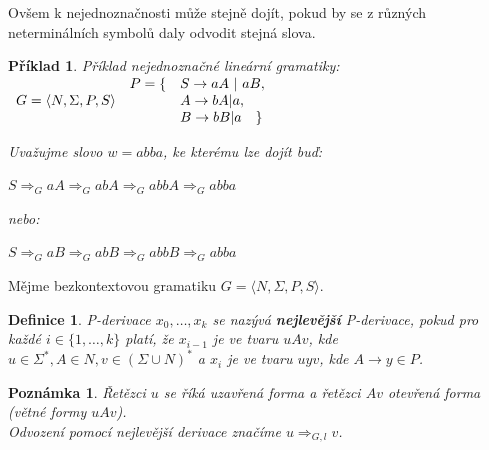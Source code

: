 \documentclass[10pt, a4paper, titlepage]{article}
\theoremstyle{note}
\newtheorem{definice}{\textbf{Definice}}
\newtheorem{priklad}{\textbf{Příklad}}
\newtheorem{poznamka}{\textbf{Poznámka}}
\begin{document}
Ovšem k nejednoznačnosti může stejně dojít, pokud by se z různých neterminálních symbolů daly odvodit stejná slova.

\begin{priklad}
Příklad nejednoznačné lineární gramatiky: \\
$\begin{array}{l}
G=\langle N,\Sigma,P,S \rangle \\
\end{array}\\
\begin{array}{l l}
P= \lbrace &S \rightarrow aA\ |\ aB, \\
& A \rightarrow bA|a, \\
& B \rightarrow bB|a \quad \rbrace
\end{array}
$

Uvažujme slovo $w=abba$, ke kterému lze dojít buď:

$S \Rightarrow_G aA \Rightarrow_G abA \Rightarrow_G abbA \Rightarrow_G abba$

nebo:

$S \Rightarrow_G aB \Rightarrow_G abB \Rightarrow_G abbB \Rightarrow_G abba$
\end{priklad}

Mějme bezkontextovou gramatiku $G = \langle N,\Sigma,P,S \rangle$.

\begin{definice}
P-derivace $x_0,\ldots,x_k$ se nazývá \textbf{nejlevější} P-derivace, pokud pro každé $i \in \lbrace 1,\ldots,k \rbrace$ platí, že $x_{i-1}$ je ve tvaru $uAv$, kde $u \in \Sigma^*,A\in N,v \in (\Sigma \cup N)^*$ a $x_i$ je ve tvaru $uyv$, kde $A \rightarrow y \in P$.
\end{definice}

\begin{poznamka}
Řetězci $u$ se říká uzavřená forma a řetězci $Av$ otevřená forma (větné formy $uAv$).\\
Odvození pomocí nejlevější derivace značíme $u \Rightarrow_{G,l} v$.
\end{poznamka}
\end{document}
